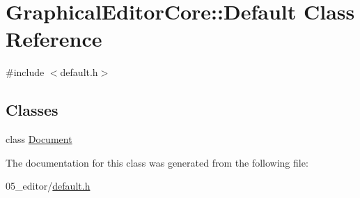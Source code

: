 \hypertarget{classGraphicalEditorCore_1_1Default}{}\section{Graphical\+Editor\+Core\+:\+:Default Class Reference}
\label{classGraphicalEditorCore_1_1Default}


{\ttfamily \#include $<$default.\+h$>$}

\subsection*{Classes}
\begin{DoxyCompactItemize}
\item 
class \hyperlink{classGraphicalEditorCore_1_1Default_1_1Document}{Document}
\end{DoxyCompactItemize}


The documentation for this class was generated from the following file\+:\begin{DoxyCompactItemize}
\item 
05\+\_\+editor/\hyperlink{default_8h}{default.\+h}\end{DoxyCompactItemize}
